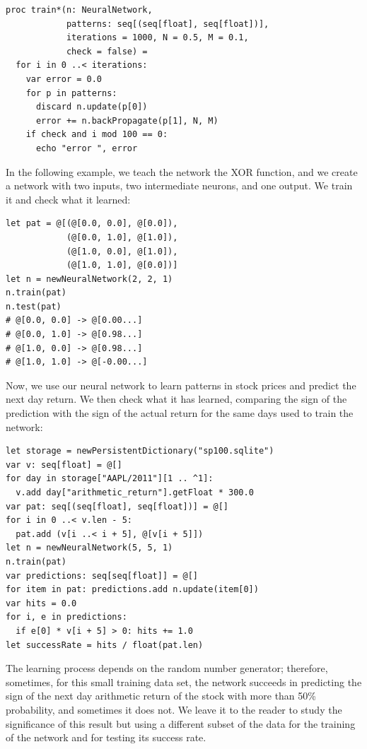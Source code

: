 \documentclass[justified, sixbynine]{tufte-book}
\def\ft{\small\tt}
\theoremstyle{plain}%
\newtheorem * {corollary}{Corollary}
\theoremstyle{definition}
\theoremstyle{remark}
\newtheorem * {remark}{Remark}
\newtheorem * {note}{Note}
\begin{document}
\begin{fullwidth}
\begin{lstlisting}[caption={in file: {\ft nlib.nim}}]
proc train*(n: NeuralNetwork,
            patterns: seq[(seq[float], seq[float])],
            iterations = 1000, N = 0.5, M = 0.1,
            check = false) =
  for i in 0 ..< iterations:
    var error = 0.0
    for p in patterns:
      discard n.update(p[0])
      error += n.backPropagate(p[1], N, M)
    if check and i mod 100 == 0:
      echo "error ", error
\end{lstlisting}

In the following example, we teach the network the XOR function, and we create a network with two inputs, two intermediate neurons, and one output. We train it and check what it learned:

\begin{lstlisting}
let pat = @[(@[0.0, 0.0], @[0.0]),
            (@[0.0, 1.0], @[1.0]),
            (@[1.0, 0.0], @[1.0]),
            (@[1.0, 1.0], @[0.0])]
let n = newNeuralNetwork(2, 2, 1)
n.train(pat)
n.test(pat)
# @[0.0, 0.0] -> @[0.00...]
# @[0.0, 1.0] -> @[0.98...]
# @[1.0, 0.0] -> @[0.98...]
# @[1.0, 1.0] -> @[-0.00...]
\end{lstlisting}

Now, we use our neural network to learn patterns in stock prices and predict the next day return. We then check what it has learned, comparing the sign of the prediction with the sign of the actual return for the same days used to train the network:
\begin{lstlisting}[caption={in file: {\ft test.nim}}]
let storage = newPersistentDictionary("sp100.sqlite")
var v: seq[float] = @[]
for day in storage["AAPL/2011"][1 .. ^1]:
  v.add day["arithmetic_return"].getFloat * 300.0
var pat: seq[(seq[float], seq[float])] = @[]
for i in 0 ..< v.len - 5:
  pat.add (v[i ..< i + 5], @[v[i + 5]])
let n = newNeuralNetwork(5, 5, 1)
n.train(pat)
var predictions: seq[seq[float]] = @[]
for item in pat: predictions.add n.update(item[0])
var hits = 0.0
for i, e in predictions:
  if e[0] * v[i + 5] > 0: hits += 1.0
let successRate = hits / float(pat.len)
\end{lstlisting}
The learning process depends on the random number generator; therefore, sometimes, for this small training data set, the network succeeds in predicting the sign of the next day arithmetic return of the stock with more than 50\% probability, and sometimes it does not. We leave it to the reader to study the significance of this result but using a different subset of the data for the training of the network and for testing its success rate.


\end{fullwidth}
\end{document}
